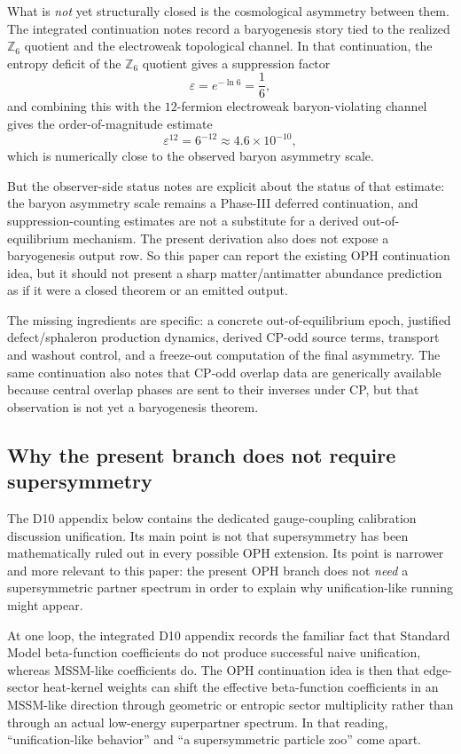 \documentclass[11pt]{article}
\begin{document}
What is \emph{not} yet structurally closed is the cosmological asymmetry between them. The
integrated continuation notes record a baryogenesis story tied to the realized
\(\mathbb Z_6\) quotient and the electroweak topological channel. In that continuation, the
entropy deficit of the \(\mathbb Z_6\) quotient gives a suppression factor
\[
\varepsilon = e^{-\ln 6} = \frac{1}{6},
\]
and combining this with the \(12\)-fermion electroweak baryon-violating channel gives the
order-of-magnitude estimate
\[
\varepsilon^{12}=6^{-12}\approx 4.6\times 10^{-10},
\]
which is numerically close to the observed baryon asymmetry scale.

But the observer-side status notes are explicit about the status of that estimate: the baryon
asymmetry scale remains a Phase-III deferred continuation, and suppression-counting estimates are
not a substitute for a derived out-of-equilibrium mechanism. The present derivation
also does not expose a baryogenesis output row. So this paper can report the
existing OPH continuation idea, but it should not present a sharp matter/antimatter abundance
prediction as if it were a closed theorem or an emitted output.

The missing ingredients are specific: a concrete out-of-equilibrium epoch, justified
defect/sphaleron production dynamics, derived CP-odd source terms, transport and washout control,
and a freeze-out computation of the final asymmetry. The same continuation also notes that CP-odd
overlap data are generically available because central overlap phases are sent to their inverses
under CP, but that observation is not yet a baryogenesis theorem.

\subsection{Why the present branch does not require supersymmetry}

The D10 appendix below contains the dedicated gauge-coupling calibration discussion
unification. Its main point is not that supersymmetry has been mathematically ruled out in every
possible OPH extension. Its point is narrower and more relevant to this paper: the present
OPH branch does not \emph{need} a supersymmetric partner spectrum in order to explain why
unification-like running might appear.

At one loop, the integrated D10 appendix records the familiar fact that Standard Model beta-function
coefficients do not produce successful naive unification, whereas MSSM-like coefficients do. The
OPH continuation idea is then that edge-sector heat-kernel weights can shift the effective
beta-function coefficients in an MSSM-like direction through geometric or entropic sector
multiplicity rather than through an actual low-energy superpartner spectrum. In that reading,
``unification-like behavior'' and ``a supersymmetric particle zoo'' come apart.
\end{document}
